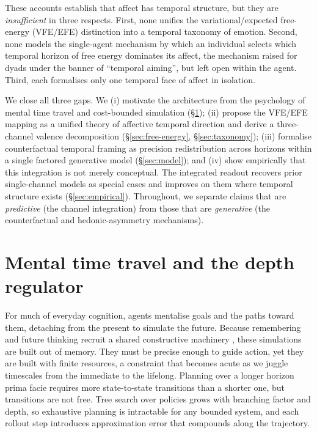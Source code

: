 \documentclass[11pt,a4paper]{article}
\begin{document}
These accounts establish that affect has temporal structure, but they are
\emph{insufficient} in three respects. First, none unifies the variational/expected
free-energy (VFE/EFE) distinction into a temporal taxonomy of emotion. Second, none
models the single-agent mechanism by which an individual selects which temporal
horizon of free energy dominates its affect, the mechanism \citet{hinrichs2025temporal}
raised for dyads under the banner of ``temporal aiming'', but left open within the
agent. Third, each formalises only one temporal face of affect in isolation.

We close all three gaps. We (i) motivate the architecture from the psychology of
mental time travel and cost-bounded simulation (\S\ref{sec:mtt}); (ii) propose the
VFE/EFE mapping as a unified theory of affective temporal direction and derive a
three-channel valence decomposition (\S\ref{sec:free-energy}, \S\ref{sec:taxonomy});
(iii) formalise counterfactual temporal framing as precision redistribution across
horizons within a single factored generative model (\S\ref{sec:model}); and (iv)
show empirically that this integration is not merely conceptual. The integrated readout
recovers prior single-channel models as special cases and improves on them where
temporal structure exists (\S\ref{sec:empirical}). Throughout, we separate claims that are
\emph{predictive} (the channel integration) from those that are \emph{generative}
(the counterfactual and hedonic-asymmetry mechanisms).

\section{Mental time travel and the depth regulator}\label{sec:mtt}
For much of everyday cognition, agents mentalise goals and the paths toward them,
detaching from the present to simulate the future. Because remembering and future
thinking recruit a shared constructive machinery \citep{schacter-addis2007}, these
simulations are built out of memory. They must be precise enough to guide action,
yet they are built with finite resources, a constraint that becomes acute as we
juggle timescales from the immediate to the lifelong. Planning over a longer horizon
prima facie requires more state-to-state transitions than a shorter one, but
transitions are not free. Tree search over policies grows with branching factor and
depth, so exhaustive planning is intractable for any bounded system, and each
rollout step introduces approximation error that compounds along the trajectory.
\end{document}
